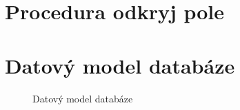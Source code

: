 \documentclass{article}
\begin{document}
\newpage

\begin{appendices}
\section{Procedura odkryj pole}


\newpage
\section{Datový model databáze}
\begin{figure}[!h]
\begin{center}
    \caption{Datový model databáze}
    \label{fig:era}
\end{center}
\end{figure}

\newpage

\end{appendices}
\end{document}
